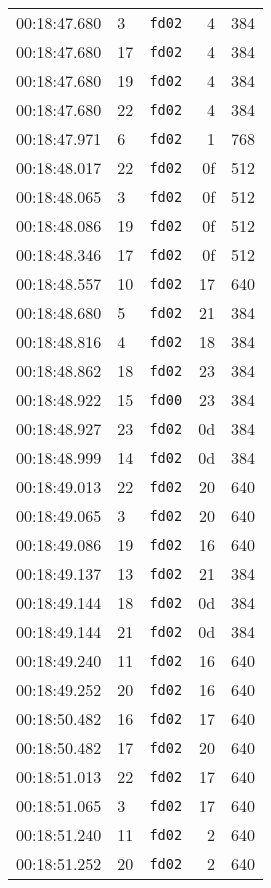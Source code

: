 \documentclass{article}
\begin{document}
\begin{longtable}{lllrr}
00:18:47.680 & 3 & \texttt{fd02} & 4 & 384 \\
00:18:47.680 & 17 & \texttt{fd02} & 4 & 384 \\
00:18:47.680 & 19 & \texttt{fd02} & 4 & 384 \\
00:18:47.680 & 22 & \texttt{fd02} & 4 & 384 \\
00:18:47.971 & 6 & \texttt{fd02} & 1 & 768 \\
00:18:48.017 & 22 & \texttt{fd02} & 0f & 512 \\
00:18:48.065 & 3 & \texttt{fd02} & 0f & 512 \\
00:18:48.086 & 19 & \texttt{fd02} & 0f & 512 \\
00:18:48.346 & 17 & \texttt{fd02} & 0f & 512 \\
00:18:48.557 & 10 & \texttt{fd02} & 17 & 640 \\
00:18:48.680 & 5 & \texttt{fd02} & 21 & 384 \\
00:18:48.816 & 4 & \texttt{fd02} & 18 & 384 \\
00:18:48.862 & 18 & \texttt{fd02} & 23 & 384 \\
00:18:48.922 & 15 & \texttt{fd00} & 23 & 384 \\
00:18:48.927 & 23 & \texttt{fd02} & 0d & 384 \\
00:18:48.999 & 14 & \texttt{fd02} & 0d & 384 \\
00:18:49.013 & 22 & \texttt{fd02} & 20 & 640 \\
00:18:49.065 & 3 & \texttt{fd02} & 20 & 640 \\
00:18:49.086 & 19 & \texttt{fd02} & 16 & 640 \\
00:18:49.137 & 13 & \texttt{fd02} & 21 & 384 \\
00:18:49.144 & 18 & \texttt{fd02} & 0d & 384 \\
00:18:49.144 & 21 & \texttt{fd02} & 0d & 384 \\
00:18:49.240 & 11 & \texttt{fd02} & 16 & 640 \\
00:18:49.252 & 20 & \texttt{fd02} & 16 & 640 \\
00:18:50.482 & 16 & \texttt{fd02} & 17 & 640 \\
00:18:50.482 & 17 & \texttt{fd02} & 20 & 640 \\
00:18:51.013 & 22 & \texttt{fd02} & 17 & 640 \\
00:18:51.065 & 3 & \texttt{fd02} & 17 & 640 \\
00:18:51.240 & 11 & \texttt{fd02} & 2 & 640 \\
00:18:51.252 & 20 & \texttt{fd02} & 2 & 640 \\

\end{longtable}
\end{document}
